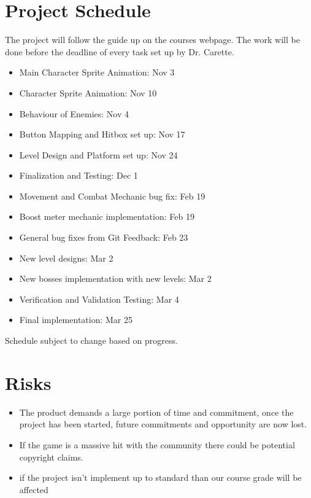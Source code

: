 \documentclass{article}
\begin{document}
	\section{Project Schedule}
	The project will follow the guide up on the courses webpage. The work will be done before the deadline of every task set up by Dr. Carette.\\
	\begin{itemize}
		\item Main Character Sprite Animation: Nov 3
		\item Character Sprite Animation: Nov 10
		\item Behaviour of Enemies: Nov 4
		\item Button Mapping and Hitbox set up: Nov 17
		\item Level Design and Platform set up: Nov 24
		\item Finalization and Testing: Dec 1
		\item Movement and Combat Mechanic bug fix: Feb 19
		\item Boost meter mechanic implementation: Feb 19
		\item General bug fixes from Git Feedback: Feb 23
		\item New level designs: Mar 2
		\item New bosses implementation with new levels: Mar 2 
		\item Verification and Validation Testing: Mar 4
		\item Final implementation: Mar 25
	\end{itemize}
	Schedule subject to change based on progress.

	\section{Risks}
	\begin{itemize}
		\item The product demands a large portion of time and commitment, once the project has been started, future commitments and opportunity are now lost.
		\item If the game is a massive hit with the community  there could be potential copyright claims.
		\item if the project isn’t implement up to standard than our course grade will be affected
	\end{itemize}
\end{document}
